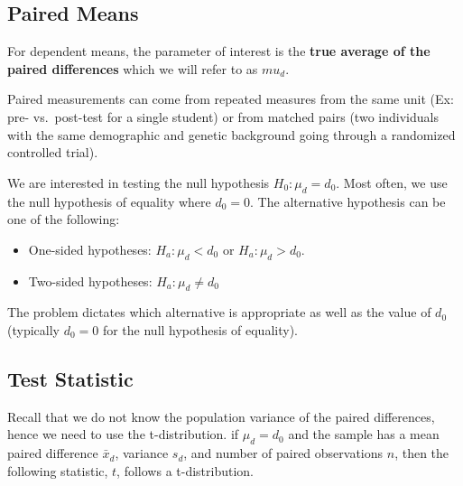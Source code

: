\documentclass[
  letterpaper,
  DIV=11,
  numbers=noendperiod]{scrartcl}
\providecommand{\tightlist}{%
  \setlength{\itemsep}{0pt}\setlength{\parskip}{0pt}}
\begin{document}
\subsection{Paired Means}\label{paired-means}

For dependent means, the parameter of interest is the \textbf{true
average of the paired differences} which we will refer to as \(mu_d\).

\begin{tcolorbox}[enhanced jigsaw, bottomtitle=1mm, colback=white, opacityback=0, leftrule=.75mm, opacitybacktitle=0.6, coltitle=black, left=2mm, colframe=quarto-callout-note-color-frame, toptitle=1mm, colbacktitle=quarto-callout-note-color!10!white, titlerule=0mm, title=\textcolor{quarto-callout-note-color}{\faInfo}\hspace{0.5em}{Note}, arc=.35mm, rightrule=.15mm, breakable, bottomrule=.15mm, toprule=.15mm]

Paired measurements can come from repeated measures from the same unit
(Ex: pre- vs.~post-test for a single student) or from matched pairs (two
individuals with the same demographic and genetic background going
through a randomized controlled trial).

\end{tcolorbox}

We are interested in testing the null hypothesis \(H_0: \mu_d=d_0\).
Most often, we use the null hypothesis of equality where \(d_0=0\). The
alternative hypothesis can be one of the following:

\begin{itemize}
\tightlist
\item
  One-sided hypotheses: \(H_a: \mu_d< d_0\) or \(H_a: \mu_d> d_0\).
\item
  Two-sided hypotheses: \(H_a: \mu_d \neq d_0\)
\end{itemize}

The problem dictates which alternative is appropriate as well as the
value of \(d_0\) (typically \(d_0=0\) for the null hypothesis of
equality).

\subsection{Test Statistic}\label{test-statistic-3}

Recall that we do not know the population variance of the paired
differences, hence we need to use the t-distribution. if \(\mu_d=d_0\)
and the sample has a mean paired difference \(\bar{x}_d\), variance
\(s_d\), and number of paired observations \(n\), then the following
statistic, \(t\), follows a t-distribution.
\end{document}
